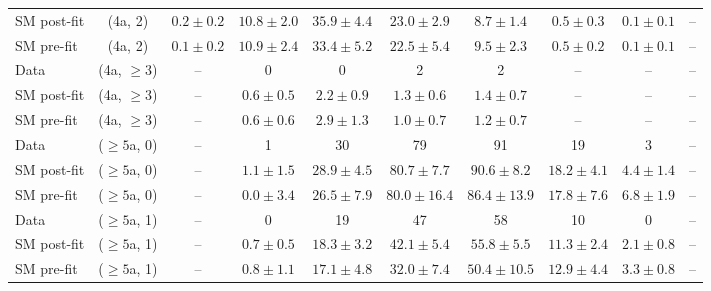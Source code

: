 \begin{table}[h!]
{\begin{tabular}{lccccccccc}
	SM post-fit & (4a, 2)           & $0.2\pm{ 0.2 }$      & $10.8\pm{ 2.0 }$     & $35.9\pm{ 4.4 }$   & $23.0\pm{ 2.9 }$   & $8.7\pm{ 1.4 }$    & $0.5\pm{ 0.3 }$  & $0.1\pm{ 0.1 }$  & --           \\[0.5ex] 
	SM pre-fit  & (4a, 2)           & $0.1\pm{ 0.2 }$      & $10.9\pm{ 2.4 }$     & $33.4\pm{ 5.2 }$   & $22.5\pm{ 5.4 }$   & $9.5\pm{ 2.3 }$    & $0.5\pm{ 0.2 }$  & $0.1\pm{ 0.1 }$  & --           \\[0.5ex] 
	Data        & (4a, $\ge3$)      & --                   & 0                    & 0                  & 2                  & 2                  & --               & --               & --           \\[0.5ex] 
	SM post-fit & (4a, $\ge3$)      & --                   & $0.6\pm{ 0.5 }$      & $2.2\pm{ 0.9 }$    & $1.3\pm{ 0.6 }$    & $1.4\pm{ 0.7 }$    & --               & --               & --           \\[0.5ex] 
	SM pre-fit  & (4a, $\ge3$)      & --                   & $0.6\pm{ 0.6 }$      & $2.9\pm{ 1.3 }$    & $1.0\pm{ 0.7 }$    & $1.2\pm{ 0.7 }$    & --               & --               & --           \\[0.5ex] 
	Data        & ($\ge5$a, 0)      & --                   & 1                    & 30                 & 79                 & 91                 & 19               & 3                & --           \\[0.5ex] 
	SM post-fit & ($\ge5$a, 0)      & --                   & $1.1\pm{ 1.5 }$      & $28.9\pm{ 4.5 }$   & $80.7\pm{ 7.7 }$   & $90.6\pm{ 8.2 }$   & $18.2\pm{ 4.1 }$ & $4.4\pm{ 1.4 }$  & --           \\[0.5ex] 
	SM pre-fit  & ($\ge5$a, 0)      & --                   & $0.0\pm{ 3.4 }$      & $26.5\pm{ 7.9 }$   & $80.0\pm{ 16.4 }$  & $86.4\pm{ 13.9 }$  & $17.8\pm{ 7.6 }$ & $6.8\pm{ 1.9 }$  & --           \\[0.5ex] 
	Data        & ($\ge5$a, 1)      & --                   & 0                    & 19                 & 47                 & 58                 & 10               & 0                & --           \\[0.5ex] 
	SM post-fit & ($\ge5$a, 1)      & --                   & $0.7\pm{ 0.5 }$      & $18.3\pm{ 3.2 }$   & $42.1\pm{ 5.4 }$   & $55.8\pm{ 5.5 }$   & $11.3\pm{ 2.4 }$ & $2.1\pm{ 0.8 }$  & --           \\[0.5ex] 
	SM pre-fit  & ($\ge5$a, 1)      & --                   & $0.8\pm{ 1.1 }$      & $17.1\pm{ 4.8 }$   & $32.0\pm{ 7.4 }$   & $50.4\pm{ 10.5 }$  & $12.9\pm{ 4.4 }$ & $3.3\pm{ 0.8 }$  & --           \\[0.5ex] 

\end{tabular}}
\end{table}
